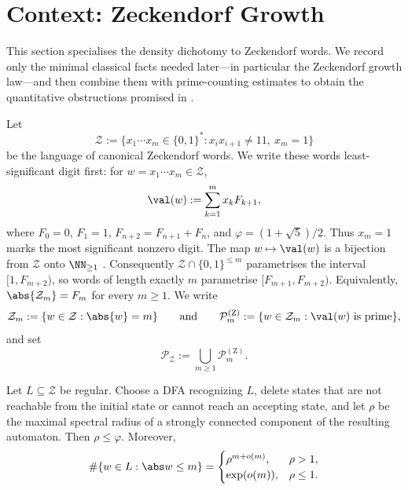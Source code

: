 \section{Context: Zeckendorf Growth}
\label{sec:zeckendorf}

This section specialises the density dichotomy to Zeckendorf words. We
record only the minimal classical facts needed later---in particular the
Zeckendorf growth law---and then combine them with prime-counting
estimates to obtain the quantitative obstructions promised in
.

Let
\[
  \mathcal Z
  :=\{x_1\cdots x_m\in\{0,1\}^\ast:
      x_ix_{i+1}\neq 11,\ x_m=1\}
\]
be the language of canonical Zeckendorf words. We write these words
least-significant digit first: for \(w=x_1\cdots x_m\in\mathcal Z\),
\[
  \val(w):=\sum_{k=1}^m x_kF_{k+1},
\]
where \(F_0=0\), \(F_1=1\), \(F_{n+2}=F_{n+1}+F_n\), and
\(\varphi=(1+\sqrt5)/2\). Thus \(x_m=1\) marks the most significant
nonzero digit. The map \(w\mapsto\val(w)\) is a bijection from
\(\mathcal Z\) onto \(\NN_{\ge 1}\) \cite{Zeckendorf1972}.
Consequently \(\mathcal Z\cap\{0,1\}^{\le m}\) parametrises the
interval \([1,F_{m+2})\), so words of length exactly \(m\) parametrise
\([F_{m+1},F_{m+2})\). Equivalently,
\(\abs{\mathcal Z_m}=F_m\) for every \(m\ge 1\).
We write
\[
  \mathcal Z_m:=\{w\in\mathcal Z:\abs{w}=m\}
  \qquad\text{and}\qquad
  \mathcal P_m^{(\mathrm Z)}
  :=\{w\in\mathcal Z_m:\val(w)\text{ is prime}\},
\]
and set
\[
  \mathcal P_{\mathcal Z}
  :=\bigcup_{m\ge 1}\mathcal P_m^{(\mathrm Z)}.
\]

\begin{lemma}
  \label{lem:zeckendorf-length-growth}
  Let \(L\subseteq\mathcal Z\) be regular. Choose a DFA recognizing
  \(L\), delete states that are not reachable from the initial state or
  cannot reach an accepting state, and let \(\rho\) be the maximal
  spectral radius of a strongly connected component of the resulting
  automaton. Then \(\rho\le\varphi\). Moreover,
  \[
    \#\{w\in L:\abs w\le m\}=
    \begin{cases}
      \rho^{m+o(m)}, & \rho>1,\\
      \exp(o(m)), & \rho\le1.
    \end{cases}
  \]
\end{lemma}

